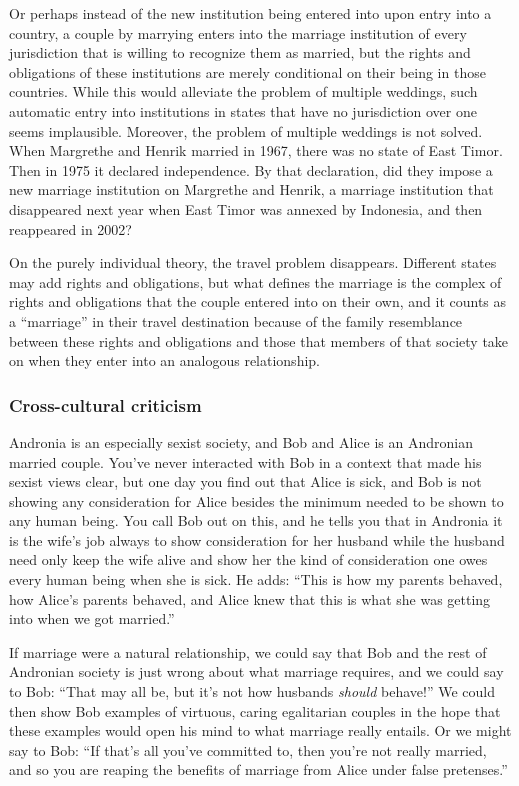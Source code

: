 Or perhaps instead of the new institution being entered into upon entry into a country, a couple by marrying enters into the marriage institution of every
jurisdiction that is willing to recognize them as married, but the rights and obligations of these institutions are merely conditional on their being in
those countries. While this would alleviate the problem of multiple weddings, such automatic entry into institutions in states that have no jurisdiction over one seems implausible. 
Moreover, the problem of multiple weddings is not solved. When Margrethe and Henrik married in 1967, there was no state of East Timor. Then in
1975 it declared independence. By that declaration, did they impose a new marriage institution on Margrethe and Henrik, a marriage institution that disappeared
next year when East Timor was annexed by Indonesia, and then reappeared in 2002? 

On the purely individual theory, the travel problem disappears. Different states may add rights and obligations, but what defines the marriage is the 
complex of rights and obligations that the couple entered into on their own, and it counts as a ``marriage'' in their travel destination because of the
family resemblance between these rights and obligations and those that members of that society take on when they enter into an analogous relationship.

\subsubsection{Cross-cultural criticism}
Andronia is an especially sexist society, and Bob and Alice is an Andronian married couple. You've never interacted with Bob in a context that made his sexist 
views clear, but one day you find out that Alice is sick, and Bob is not showing any consideration for Alice besides the minimum needed to be shown to any human being. You
call Bob out on this, and he tells you that in Andronia it is the wife's job always to show consideration for her husband while the husband need only keep the wife alive
and show her the kind of consideration one owes every human being when she is sick. He adds: ``This is how my parents behaved, how Alice's parents behaved, and Alice knew that this is what she was getting into when we got married.''

If marriage were a natural relationship, we could say that Bob and the rest of Andronian society is just wrong about what marriage requires, and we could
say to Bob: ``That may all be, but it's not how husbands \textit{should} behave!'' We could then show Bob examples of virtuous, caring egalitarian couples
in the hope that these examples would open his mind to what marriage really entails. Or we might say to Bob: ``If that's all you've committed to, then 
you're not really married, and so you are reaping the benefits of marriage from Alice under false pretenses.'' 

